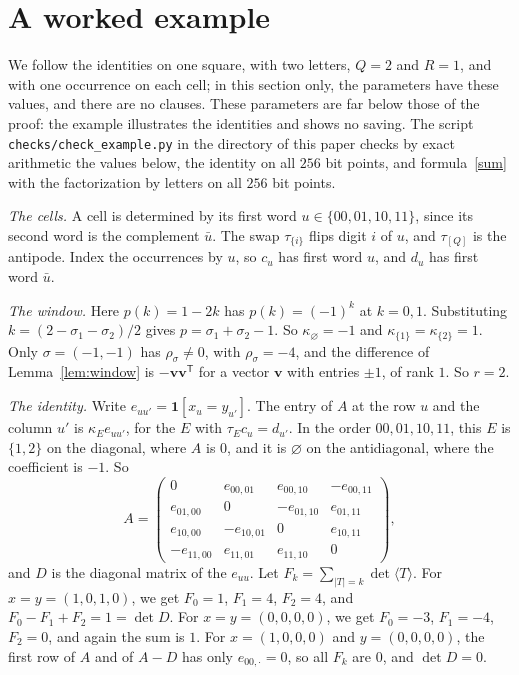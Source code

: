 \documentclass[11pt]{article}
\numberwithin{equation}{section}
\theoremstyle{remark}
\begin{document}
\section{A worked example}\label{sec:example}

We follow the identities on one square, with two letters, $Q=2$ and $R=1$, and with one occurrence on each cell; in this section only, the parameters have these values, and there are no clauses. These parameters are far below those of the proof: the example illustrates the identities and shows no saving. The script \texttt{checks/check\_example.py} in the directory of this paper checks by exact arithmetic the values below, the identity on all $256$ bit points, and formula~\eqref{sum} with the factorization by letters on all $256$ bit points.

\medskip\noindent\emph{The cells.} A cell is determined by its first word $u\in\{00,01,10,11\}$, since its second word is the complement $\bar u$. The swap $\tau_{\{i\}}$ flips digit $i$ of $u$, and $\tau_{[Q]}$ is the antipode. Index the occurrences by $u$, so $c_u$ has first word $u$, and $d_u$ has first word $\bar u$.

\medskip\noindent\emph{The window.} Here $p(k)=1-2k$ has $p(k)=(-1)^k$ at $k=0,1$. Substituting $k=(2-\sigma_1-\sigma_2)/2$ gives $p=\sigma_1+\sigma_2-1$. So $\kappa_\varnothing=-1$ and $\kappa_{\{1\}}=\kappa_{\{2\}}=1$. Only $\sigma=(-1,-1)$ has $\rho_\sigma\ne0$, with $\rho_\sigma=-4$, and the difference of Lemma~\ref{lem:window} is $-\mathbf v\mathbf v^{\mathsf T}$ for a vector $\mathbf v$ with entries $\pm1$, of rank $1$. So $r=2$.

\medskip\noindent\emph{The identity.} Write $e_{uu'}=\mathbf 1[x_u=y_{u'}]$. The entry of $A$ at the row $u$ and the column $u'$ is $\kappa_E e_{uu'}$, for the $E$ with $\tau_Ec_u=d_{u'}$. In the order $00,01,10,11$, this $E$ is $\{1,2\}$ on the diagonal, where $A$ is $0$, and it is $\varnothing$ on the antidiagonal, where the coefficient is $-1$. So
\[
A=\begin{pmatrix}0&e_{00,01}&e_{00,10}&-e_{00,11}\\ e_{01,00}&0&-e_{01,10}&e_{01,11}\\ e_{10,00}&-e_{10,01}&0&e_{10,11}\\ -e_{11,00}&e_{11,01}&e_{11,10}&0\end{pmatrix},
\]
and $D$ is the diagonal matrix of the $e_{uu}$. Let $F_k=\sum_{|T|=k}\det\langle T\rangle$. For $x=y=(1,0,1,0)$, we get $F_0=1$, $F_1=4$, $F_2=4$, and $F_0-F_1+F_2=1=\det D$. For $x=y=(0,0,0,0)$, we get $F_0=-3$, $F_1=-4$, $F_2=0$, and again the sum is $1$. For $x=(1,0,0,0)$ and $y=(0,0,0,0)$, the first row of $A$ and of $A-D$ has only $e_{00,\cdot}=0$, so all $F_k$ are $0$, and $\det D=0$.
\end{document}

